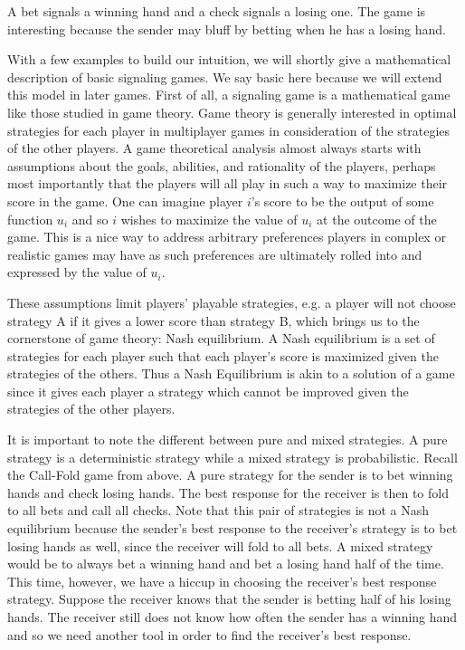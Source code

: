 \documentclass{article}
\begin{document}
A bet signals a winning hand and a check signals a losing one. The game is interesting because the sender may bluff by betting when he has a losing hand. 

With a few examples to build our intuition, we will shortly give a mathematical description of basic signaling games. We say basic here because we will extend this model in later games. First of all, a signaling game is a mathematical game like those studied in game theory. Game theory is generally interested in optimal strategies for each player in multiplayer games in consideration of the strategies of the other players. A game theoretical analysis almost always starts with assumptions about the goals, abilities, and rationality of the players, perhaps most importantly that the players will all play in such a way to maximize their score in the game. One can imagine player $i$'s score to be the output of some function $u_i$ and so $i$ wishes to maximize the value of $u_i$ at the outcome of the game. This is a nice way to address arbitrary preferences players in complex or realistic games may have as such preferences are ultimately rolled into and expressed by the value of $u_i$. 

These assumptions limit players' playable strategies, e.g. a player will not choose strategy A if it gives a lower score than strategy B, which brings us to the cornerstone of game theory: Nash equilibrium. A Nash equilibrium is a set of strategies for each player such that each player's score is maximized given the strategies of the others. Thus a Nash Equilibrium is akin to a solution of a game since it gives each player a strategy which cannot be improved given the strategies of the other players.

It is important to note the different between pure and mixed strategies. A pure strategy is a deterministic strategy while a mixed strategy is probabilistic. Recall the Call-Fold game from above. A pure strategy for the sender is to bet winning hands and check losing hands. The best response for the receiver is then to fold to all bets and call all checks. Note that this pair of strategies is not a Nash equilibrium because the sender's best response to the receiver's strategy is to bet losing hands as well, since the receiver will fold to all bets. A mixed strategy would be to always bet a winning hand and bet a losing hand half of the time. This time, however, we have a hiccup in choosing the receiver's best response strategy. Suppose the receiver knows that the sender is betting half of his losing hands. The receiver still does not know how often the sender has a winning hand and so we need another tool in order to find the receiver's best response.
\end{document}
